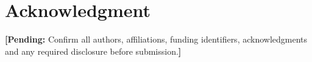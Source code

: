 \documentclass[10pt,journal]{IEEEtran}
\newif\ifIncludeAppendix
\newif\ifIncludeDeclarations
\newcommand{\placeholder}[1]{\textit{[#1]}}
\newcommand{\pending}[1]{\par\smallskip\noindent\textbf{[Pending:} #1\textbf{]}\par\smallskip}
\begin{document}
\ifIncludeAppendix
\appendices

\section{Additional Derivations}
\label{app:proofs}
\placeholder{Provide the complete supporting derivations referenced
from the main text.}
\fi

\section*{Acknowledgment}
\pending{Confirm all authors, affiliations, funding identifiers, acknowledgments and any required disclosure before submission.}

\ifIncludeDeclarations
\section*{Conflict of Interest}
\placeholder{Insert the authors' verified competing-interest statement.}

\section*{Data and Code Availability}
\placeholder{State the actual availability of data, code, configurations,
and instructions, including any access restrictions.}
\fi
\end{document}
